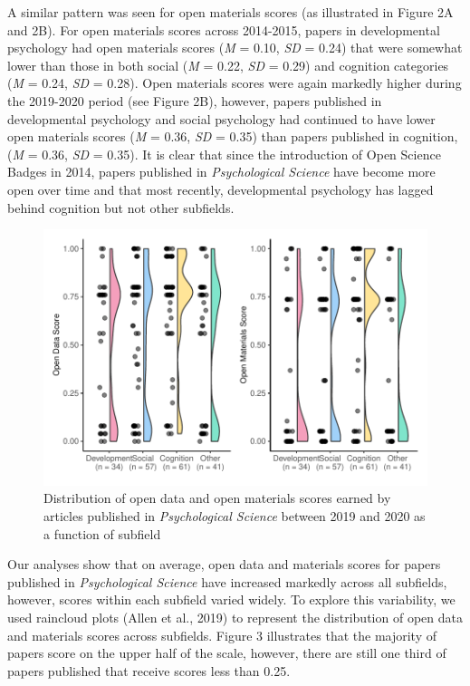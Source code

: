\documentclass[
  english,
  man,floatsintext]{apa6}
\begin{document}
A similar pattern was seen for open materials scores (as illustrated in Figure 2A and 2B). For open materials scores across 2014-2015, papers in developmental psychology had open materials scores (\emph{M} = 0.10, \emph{SD} = 0.24) that were somewhat lower than those in both social (\emph{M} = 0.22, \emph{SD} = 0.29) and cognition categories (\emph{M} = 0.24, \emph{SD} = 0.28). Open materials scores were again markedly higher during the 2019-2020 period (see Figure 2B), however, papers published in developmental psychology and social psychology had continued to have lower open materials scores (\emph{M} = 0.36, \emph{SD} = 0.35) than papers published in cognition, (\emph{M} = 0.36, \emph{SD} = 0.35). It is clear that since the introduction of Open Science Badges in 2014, papers published in \emph{Psychological Science} have become more open over time and that most recently, developmental psychology has lagged behind cognition but not other subfields.

\begin{figure}
\centering
\includegraphics{icd_special_issue_revision_FINAL_files/figure-latex/rain-1.pdf}
\caption{\label{fig:rain}Distribution of open data and open materials scores earned by articles published in \emph{Psychological Science} between 2019 and 2020 as a function of subfield}
\end{figure}

Our analyses show that on average, open data and materials scores for papers published in \emph{Psychological Science} have increased markedly across all subfields, however, scores within each subfield varied widely. To explore this variability, we used raincloud plots (Allen et al., 2019) to represent the distribution of open data and materials scores across subfields. Figure 3 illustrates that the majority of papers score on the upper half of the scale, however, there are still one third of papers published that receive scores less than 0.25.
\end{document}

